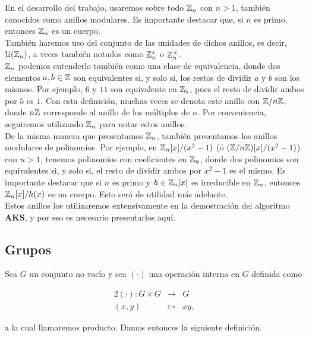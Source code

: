 En el desarrollo del trabajo, usaremos sobre todo $\mathbb{Z}_n$ con $n > 1$, también conocidos como anillos modulares. Es importante destacar que, si $n$ es primo, entonces $\mathbb{Z}_n$ es un cuerpo.\\

También haremos uso del conjunto de las unidades de dichos anillos, es decir, $\mathcal{U}(\mathbb{Z}_n)$, a veces también notados como $\mathbb{Z}_n^*$ o $\mathbb{Z}_n^\times$.\\

$\mathbb{Z}_n$ podemos entenderlo también como una clase de equivalencia, donde dos elementos $a, b \in \mathbb{Z}$ son equivalentes si, y solo si, los restos de dividir $a$ y $b$ son los mismos. Por ejemplo, $6$ y $11$ son equivalente en $\mathbb{Z}_5$, pues el resto de dividir ambos por $5$ es $1$. Con esta definición, muchas veces se denota este anillo con $\mathbb{Z} / n\mathbb{Z}$, donde $n\mathbb{Z}$ corresponde al anillo de los múltiplos de $n$. Por conveniencia, seguiremos utilizando $\mathbb{Z}_n$ para notar estos anillos.\\

De la misma manera que presentamos $\mathbb{Z}_n$, también presentamos los anillos modulares de polinomios. Por ejemplo, en $\mathbb{Z}_n[x] / (x^2 - 1)$ (ó $(\mathbb{Z}/n\mathbb{Z})[x]/(x^2 - 1)$) con $n > 1$, tenemos polinomios con coeficientes en $\mathbb{Z}_n$, donde dos polinomios son equivalentes si, y solo si, el resto de dividir ambos por $x^2 - 1$ es el mismo. Es importante destacar que si $n$ es primo y $h \in \mathbb{Z}_n[x]$ es irreducible en $\mathbb{Z}_n$, entonces $\mathbb{Z}_n[x]/h(x)$ es un cuerpo. Esto será de utilidad más adelante.\\

Estos anillos los utilizaremos extensivamente en la demostración del algoritmo \textbf{AKS}, y por eso es necesario presentarlos aquí.

\subsection{Grupos}

Sea $G$ un conjunto no vacío y sea $(\cdot)$ una operación interna en $G$ definida como

\begin{alignat*}{2}
	(\cdot): G \times G & \to & G \\
	(x, y) & \mapsto & xy,
\end{alignat*}

a la cual llamaremos producto. Damos entonces la siguiente definición.

